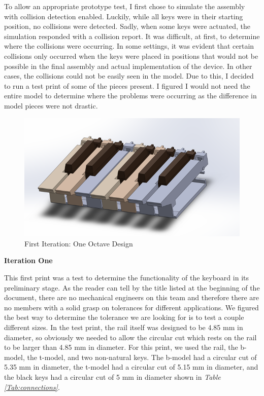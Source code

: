To allow an appropriate prototype test, I first chose to simulate the assembly with collision detection enabled. Luckily, while all keys were in their starting position, no collisions were detected. Sadly, when some keys were actuated, the simulation responded with a collision report. It was difficult, at first, to determine where the collisions were occurring. In some settings, it was evident that certain collisions only occurred when the keys were placed in positions that would not be possible in the final assembly and actual implementation of the device. In other cases, the collisions could not be easily seen in the model. Due to this, I decided to run a test print of some of the pieces present. I figured I would not need the entire model to determine where the problems were occurring as the difference in model pieces were not drastic.

\begin{figure}[h!]
  \centering
  \includegraphics[width=0.9\linewidth]{image/AssembledModel.png}
  \caption{First Iteration: One Octave Design}
  \label{fig:assembled_model}
\end{figure}

\textbf{Iteration One}

This first print was a test to determine the functionality of the keyboard in its preliminary stage. As the reader can tell by the title listed at the beginning of the document, there are no mechanical engineers on this team and therefore there are no members with a solid grasp on tolerances for different applications. We figured the best way to determine the tolerance we are looking for is to test a couple different sizes. In the test print, the rail itself was designed to be 4.85 mm in diameter, so obviously we needed to allow the circular cut which rests on the rail to be larger than 4.85 mm in diameter. For this print, we used the rail, the b-model, the t-model, and two non-natural keys. The b-model had a circular cut of 5.35 mm in diameter, the t-model had a circular cut of 5.15 mm in diameter, and the black keys had a circular cut of 5 mm in diameter shown in \textit{Table \ref{Tab:connections}}.

